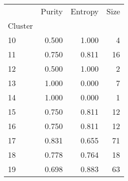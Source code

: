 \begin{tabular}{lrrr}
\toprule
{} &  Purity &  Entropy &  Size \\
Cluster &         &          &       \\
\midrule
10      &   0.500 &    1.000 &     4 \\
11      &   0.750 &    0.811 &    16 \\
12      &   0.500 &    1.000 &     2 \\
13      &   1.000 &   0.000 &     7 \\
14      &   1.000 &   0.000 &     1 \\
15      &   0.750 &    0.811 &    12 \\
16      &   0.750 &    0.811 &    12 \\
17      &   0.831 &    0.655 &    71 \\
18      &   0.778 &    0.764 &    18 \\
19      &   0.698 &    0.883 &    63 \\
\bottomrule
\end{tabular}
